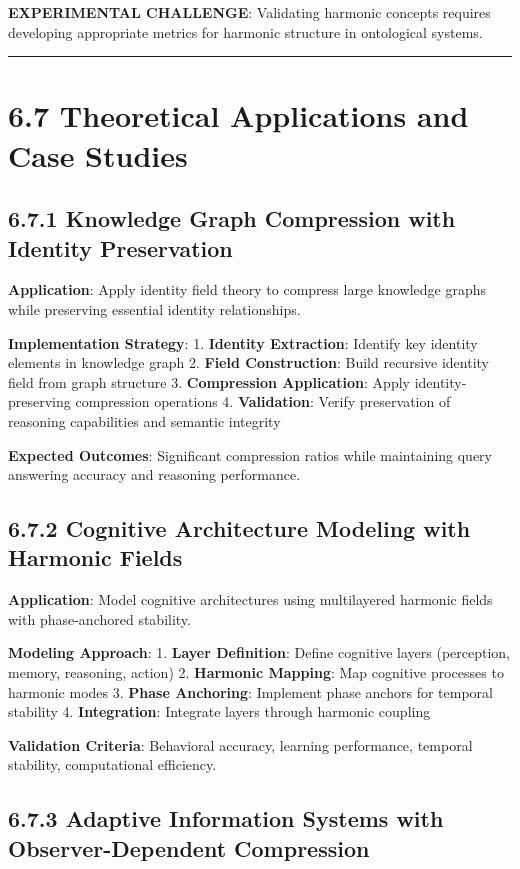 \textbf{EXPERIMENTAL CHALLENGE}: Validating harmonic concepts requires developing appropriate metrics for harmonic structure in ontological systems.

\hrule

\section{6.7 Theoretical Applications and Case Studies}

\subsection{6.7.1 Knowledge Graph Compression with Identity Preservation}

\textbf{Application}: Apply identity field theory to compress large knowledge graphs while preserving essential identity relationships.

\textbf{Implementation Strategy}:
1. \textbf{Identity Extraction}: Identify key identity elements in knowledge graph
2. \textbf{Field Construction}: Build recursive identity field from graph structure
3. \textbf{Compression Application}: Apply identity-preserving compression operations
4. \textbf{Validation}: Verify preservation of reasoning capabilities and semantic integrity

\textbf{Expected Outcomes}: Significant compression ratios while maintaining query answering accuracy and reasoning performance.

\subsection{6.7.2 Cognitive Architecture Modeling with Harmonic Fields}

\textbf{Application}: Model cognitive architectures using multilayered harmonic fields with phase-anchored stability.

\textbf{Modeling Approach}:
1. \textbf{Layer Definition}: Define cognitive layers (perception, memory, reasoning, action)
2. \textbf{Harmonic Mapping}: Map cognitive processes to harmonic modes
3. \textbf{Phase Anchoring}: Implement phase anchors for temporal stability
4. \textbf{Integration}: Integrate layers through harmonic coupling

\textbf{Validation Criteria}: Behavioral accuracy, learning performance, temporal stability, computational efficiency.

\subsection{6.7.3 Adaptive Information Systems with Observer-Dependent Compression}

